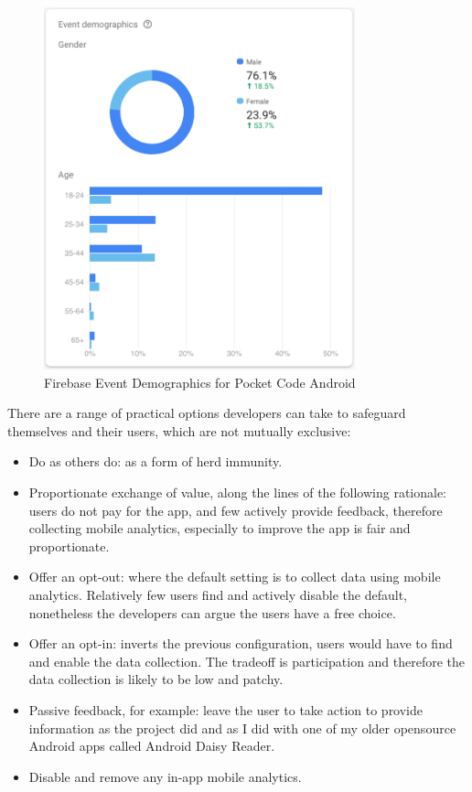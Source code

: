 \begin{figure}[htbp!]
    \centering
    \includegraphics[width=9cm]{images/firebase/Firebase-event-demographics-pocketcode-android.pdf}
    \caption{Firebase Event Demographics for Pocket Code Android}
    \label{fig:Firebase-event-demographics-pocketcode-android}
\end{figure}

There are a range of practical options developers can take to safeguard themselves and their users, which are not mutually exclusive:
\begin{itemize}
    \item Do as others do: as a form of herd immunity.
    \item Proportionate exchange of value, along the lines of the following rationale: users do not pay for the app, and few actively provide feedback, therefore collecting mobile analytics, especially to improve the app is fair and proportionate. 
    \item Offer an opt-out: where the default setting is to collect data using mobile analytics. Relatively few users find and actively disable the default, nonetheless the developers can argue the users have a free choice.
    \item Offer an opt-in: inverts the previous configuration, users would have to find and enable the data collection. The tradeoff is participation and therefore the data collection is likely to be low and patchy.
    \item Passive feedback, for example: leave the user to take action to provide information as the  project did and as I did with one of my older opensource Android apps called Android Daisy Reader.
    \item Disable and remove any in-app mobile analytics.
\end{itemize}

